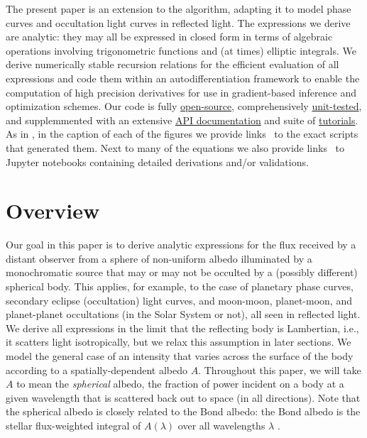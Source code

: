 \documentclass[modern]{aastex62}
\begin{document}
The present paper is an extension to the \starry algorithm,
adapting it to model phase curves and occultation light curves
in reflected light. The expressions
we derive are analytic: they may all be expressed in closed form
in terms of algebraic operations involving trigonometric functions
and (at times) elliptic integrals. We derive numerically
stable recursion relations for the efficient evaluation of all
expressions and code them within an autodifferentiation framework
to enable the computation of high precision derivatives for use in
gradient-based inference and optimization schemes.
Our code is fully
\href{https://github.com/rodluger/starry}{open-source},
comprehensively
\href{https://dev.azure.com/rodluger/starry/_test/analytics?definitionId=4}{unit-tested},
and supplemmented with an extensive
\href{https://rodluger.github.io/starry}{API documentation}
and suite of
\href{https://rodluger.github.io/starry/latest/tutorials.html}{tutorials}.
%
As in \citet{Luger2019}, in the caption of each of the figures
we provide links \codeicon\ to the exact \Python scripts that
generated them. Next to many of the equations we also provide
links \prooficon\ to \textsf{Jupyter} notebooks containing
detailed derivations and/or validations.

\section{Overview}
\label{sec:overview}

Our goal in this paper is to derive analytic expressions for the
flux received by a distant observer from a sphere of non-uniform albedo
illuminated by a monochromatic source that may or may not be
occulted by a (possibly different) spherical body. This applies, for example,
to the case of planetary phase curves, secondary
eclipse (occultation) light curves, and moon-moon, planet-moon, and
planet-planet occultations (in the Solar System or not),
all seen in reflected light. We derive all expressions in
the limit that the reflecting
body is Lambertian, i.e., it scatters light isotropically, but we relax
this assumption in later sections.
We model the general case of an
intensity that varies across the surface of the body according to a
spatially-dependent
albedo $A$. Throughout this paper, we will take $A$ to mean the \emph{spherical}
albedo, the fraction of power incident on a body at a given wavelength
that is scattered back out to space (in all directions).
Note that the spherical albedo
is closely related to the Bond albedo: the Bond albedo is the stellar
flux-weighted integral of $A(\lambda)$ over all wavelengths $\lambda$
\citep[see, e.g.,][]{Seager2010}.
\end{document}
